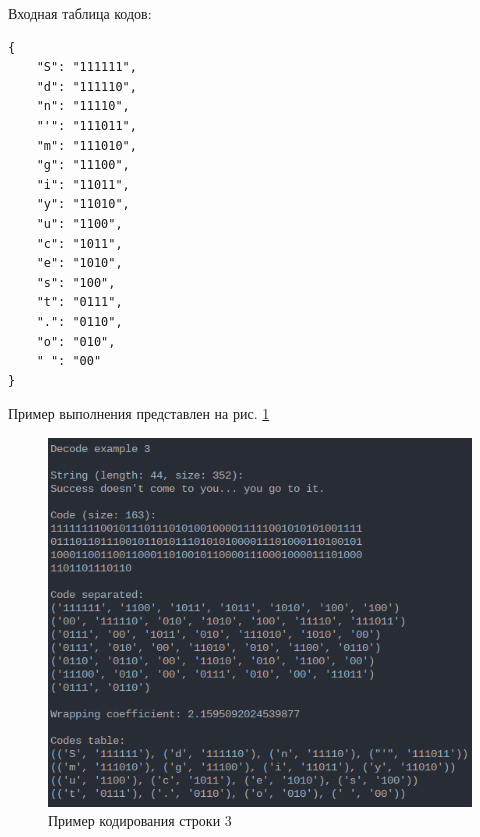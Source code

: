 Входная таблица кодов:\\ 
\begin{lstlisting}
{
    "S": "111111",
    "d": "111110",
    "n": "11110",
    "'": "111011",
    "m": "111010",
    "g": "11100",
    "i": "11011",
    "y": "11010",
    "u": "1100",
    "c": "1011",
    "e": "1010",
    "s": "100",
    "t": "0111",
    ".": "0110",
    "o": "010",
    " ": "00"
}
\end{lstlisting}

Пример выполнения представлен на рис. \ref{fig:decode_example_3}

\begin{figure}[H]
    \centering
    \includegraphics[width=0.7\linewidth]{photo/decode_example_3}
    \caption{Пример кодирования строки 3}
    \label{fig:decode_example_3}
\end{figure}

